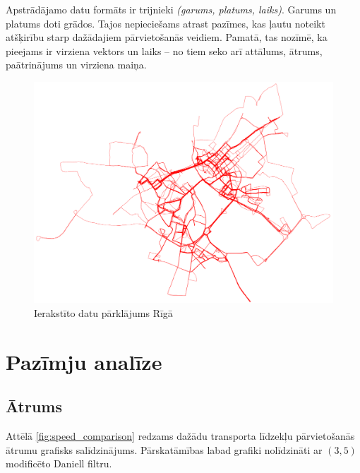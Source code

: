 \documentclass{ludis}
\begin{document}
Apstrādājamo datu formāts ir trijnieki \emph{(garums, platums, laiks)}. Garums un platums doti 
grādos. Tajos nepieciešams atrast pazīmes, kas ļautu noteikt atšķirību starp dažādajiem 
pārvietošanās veidiem. Pamatā, tas nozīmē, ka pieejams ir virziena vektors un laiks -- no tiem
seko arī attālums, ātrums, paātrinājums un virziena maiņa.

\begin{figure}
  \centering
  \includegraphics[scale=0.5]{img/all_trails}
  \caption{Ierakstīto datu pārklājums Rīgā}
  \label{fig:all_trails}
\end{figure}

\section{Pazīmju analīze}
\subsection{Ātrums}
Attēlā \ref{fig:speed_comparison} redzams dažādu transporta līdzekļu pārvietošanās ātrumu grafisks
salīdzinājums. Pārskatāmības labad grafiki nolīdzināti ar $(3, 5)$ modificēto Daniell filtru.
\end{document}
